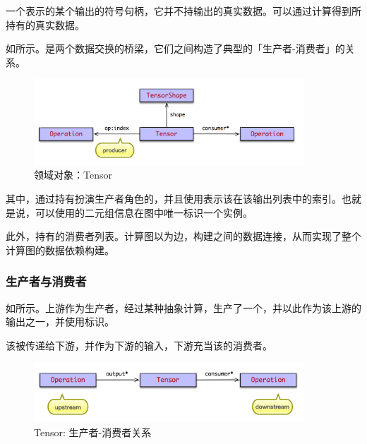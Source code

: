 \begin{content}
一个表示的某个输出的符号句柄，它并不持输出的真实数据。可以通过计算得到所持有的真实数据。

如所示。是两个数据交换的桥梁，它们之间构造了典型的「生产者-消费者」的关系。

\begin{figure}[!htbp]
\centering
\includegraphics[width=0.9\textwidth]{figures/py-tensor.png}
\caption{领域对象：Tensor}
 \label{fig:py-tensor}
\end{figure}

其中，通过持有扮演生产者角色的，并且使用表示该在该输出列表中的索引。也就是说，可以使用的二元组信息在图中唯一标识一个实例。

此外，持有的消费者列表。计算图以为边，构建之间的数据连接，从而实现了整个计算图的数据依赖构建。

\subsubsection{生产者与消费者}

如所示。上游作为生产者，经过某种抽象计算，生产了一个，并以此作为该上游的输出之一，并使用标识。

该被传递给下游，并作为下游的输入，下游充当该的消费者。

\begin{figure}[!htbp]
\centering
\includegraphics[width=0.9\textwidth]{figures/py-tensor-producter-consumer.png}
\caption{Tensor: 生产者-消费者关系}
 \label{fig:py-tensor-producter-consumer}
\end{figure}


\end{content}
